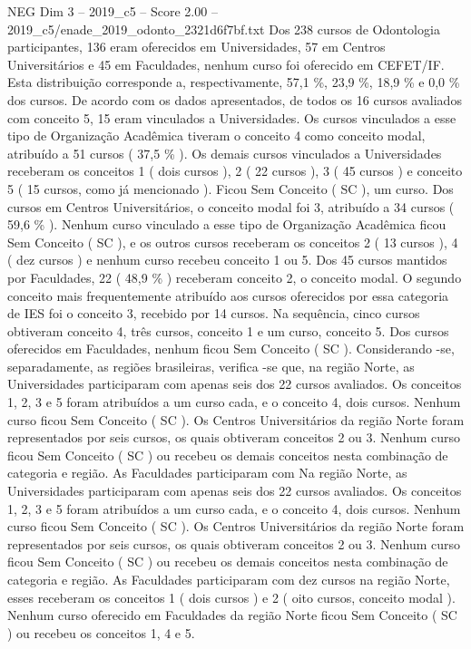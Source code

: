 \begin{textsample}{NEG Dim 3 – 2019\_c5 – Score 2.00 – 2019\_c5/enade\_2019\_odonto\_2321d6f7bf.txt}
Dos 238 cursos de Odontologia participantes, 136 eram oferecidos em Universidades, 57 em Centros Universitários e 45 em Faculdades, nenhum curso foi oferecido em CEFET/IF.
Esta distribuição corresponde a, respectivamente, 57,1 \%, 23,9 \%, 18,9 \% e 0,0 \% dos cursos.
De acordo com os dados apresentados, de todos os 16 cursos avaliados com conceito 5, 15 eram vinculados a Universidades.
Os cursos vinculados a esse tipo de Organização Acadêmica tiveram o conceito 4 como conceito modal, atribuído a 51 cursos ( 37,5 \% ).
Os demais cursos vinculados a Universidades receberam os conceitos 1 ( dois cursos ), 2 ( 22 cursos ), 3 ( 45 cursos ) e conceito 5 ( 15 cursos, como já mencionado ).
Ficou Sem Conceito ( SC ), um curso.
Dos cursos em Centros Universitários, o conceito modal foi 3, atribuído a 34 cursos ( 59,6 \% ).
Nenhum curso vinculado a esse tipo de Organização Acadêmica ficou Sem Conceito ( SC ), e os outros cursos receberam os conceitos 2 ( 13 cursos ), 4 ( dez cursos ) e nenhum curso recebeu conceito 1 ou 5.
Dos 45 cursos mantidos por Faculdades, 22 ( 48,9 \% ) receberam conceito 2, o conceito modal.
O segundo conceito mais frequentemente atribuído aos cursos oferecidos por essa categoria de IES foi o conceito 3, recebido por 14 cursos.
Na sequência, cinco cursos obtiveram conceito 4, três cursos, conceito 1 e um curso, conceito 5.
Dos cursos oferecidos em Faculdades, nenhum ficou Sem Conceito ( SC ).
Considerando -se, separadamente, as regiões brasileiras, verifica -se que, na região Norte, as Universidades participaram com apenas seis dos 22 cursos avaliados.
Os conceitos 1, 2, 3 e 5 foram atribuídos a um curso cada, e o conceito 4, dois cursos.
Nenhum curso ficou Sem Conceito ( SC ).
Os Centros Universitários da região Norte foram representados por seis cursos, os quais obtiveram conceitos 2 ou 3.
Nenhum curso ficou Sem Conceito ( SC ) ou recebeu os demais conceitos nesta combinação de categoria e região.
As Faculdades participaram com Na região Norte, as Universidades participaram com apenas seis dos 22 cursos avaliados.
Os conceitos 1, 2, 3 e 5 foram atribuídos a um curso cada, e o conceito 4, dois cursos.
Nenhum curso ficou Sem Conceito ( SC ).
Os Centros Universitários da região Norte foram representados por seis cursos, os quais obtiveram conceitos 2 ou 3.
Nenhum curso ficou Sem Conceito ( SC ) ou recebeu os demais conceitos nesta combinação de categoria e região.
As Faculdades participaram com dez cursos na região Norte, esses receberam os conceitos 1 ( dois cursos ) e 2 ( oito cursos, conceito modal ).
Nenhum curso oferecido em Faculdades da região Norte ficou Sem Conceito ( SC ) ou recebeu os conceitos 1, 4 e 5.

\end{textsample}
